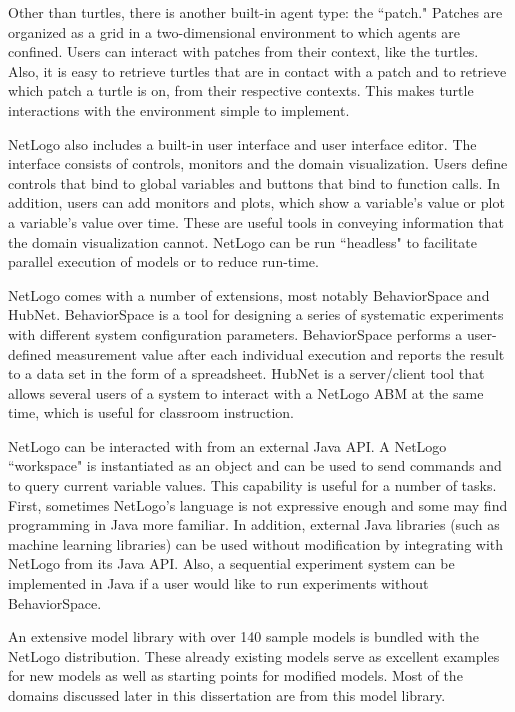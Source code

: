 Other than turtles, there is another built-in agent type: the ``patch."
Patches are organized as a grid in a two-dimensional environment to which agents are confined.
Users can interact with patches from their context, like the turtles.
Also, it is easy to retrieve turtles that are in contact with a patch and to retrieve which patch a turtle is on, from their respective contexts.
This makes turtle interactions with the environment simple to implement.

NetLogo also includes a built-in user interface and user interface editor.
The interface consists of controls, monitors and the domain visualization.
Users define controls that bind to global variables and buttons that bind to function calls.
In addition, users can add monitors and plots, which show a variable's value or plot a variable's value over time.
These are useful tools in conveying information that the domain visualization cannot.
NetLogo can be run ``headless" to facilitate parallel execution of models or to reduce run-time.

NetLogo comes with a number of extensions, most notably BehaviorSpace and HubNet.
BehaviorSpace is a tool for designing a series of systematic experiments with different system configuration parameters.
BehaviorSpace performs a user-defined measurement value after each individual execution and reports the result to a data set in the form of a spreadsheet.
HubNet is a server/client tool that allows several users of a system to interact with a NetLogo ABM at the same time, which is useful for classroom instruction.

NetLogo can be interacted with from an external Java API.
A NetLogo ``workspace" is instantiated as an object and can be used to send commands and to query current variable values.
This capability is useful for a number of tasks.
First, sometimes NetLogo's language is not expressive enough and some may find programming in Java more familiar.
In addition, external Java libraries (such as machine learning libraries) can be used without modification by integrating with NetLogo from its Java API.
Also, a sequential experiment system can be implemented in Java if a user would like to run experiments without BehaviorSpace.

An extensive model library with over 140 sample models is bundled with the NetLogo distribution.
These already existing models serve as excellent examples for new models as well as starting points for modified models.
Most of the domains discussed later in this dissertation are from this model library.

